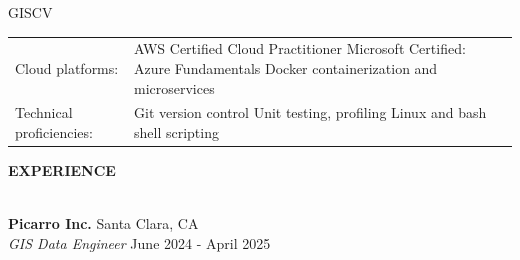 \documentclass[letterpaper]{article}
\newcommand{\lineunder} {
        \vspace*{-8pt} \\
        \hspace*{-18pt} \hrulefill \\
    }
\newcommand{\header} [1] {
        \vspace{9pt}
        {\hspace*{-18pt}\vspace*{6pt} \large \textbf {#1}}
        \vspace*{-6pt} \lineunder
        \vspace{2pt}
    }
\newcommand{\employer}[4]{
        \vspace{3pt}
        \textbf{#1}  %
        \hfill #2\\  %
        \textit{#3}  %
        \hfill #4\\  %
        \vspace{3mm}
    }
\newenvironment{skillslist}
        {
            \hspace*{-0.07in}\begin{tabular}[t]{ l L{5.17in} }
        }{
            \end{tabular}
        }
\newcommand{\impt}[1]{\uline{#1}}
\begin{document}
\begin{taggedblock}{GISCV}
\begin{skillslist}
            Cloud platforms:&
                AWS Certified Cloud Practitioner \linebreak
                Microsoft Certified: Azure Fundamentals \linebreak
                Docker containerization and microservices \linebreak
                \\
            Technical proficiencies:&
                Git version control \linebreak
                Unit testing, profiling \linebreak
                Linux and bash shell scripting \linebreak
                \\
        \end{skillslist}
    \end{taggedblock}



\header{EXPERIENCE}



    \employer
        {Picarro Inc.}
        {Santa Clara, CA}
        {GIS Data Engineer}
        {June 2024 - April 2025}
\end{document}
